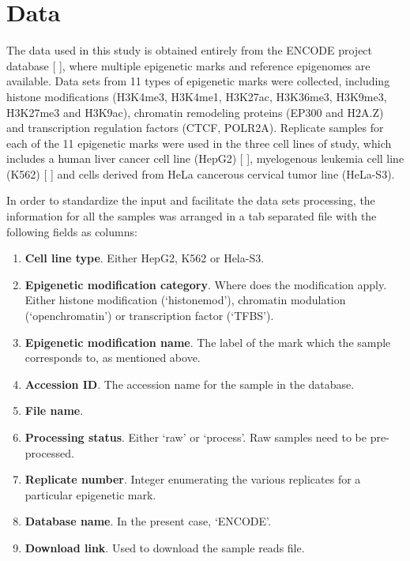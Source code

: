 \section{Data}

The data used in this study is obtained entirely from the ENCODE project database [ ], where multiple epigenetic marks and reference epigenomes are available. Data sets from 11 types of epigenetic marks were collected, including histone modifications (H3K4me3, H3K4me1, H3K27ac, H3K36me3, H3K9me3, H3K27me3 and H3K9ac), chromatin remodeling proteins (EP300 and H2A.Z) and transcription regulation factors (CTCF, POLR2A). Replicate samples for each of the 11 epigenetic marks were used in the three cell lines of study, which includes a human liver cancer cell line (HepG2) [ ], myelogenous leukemia cell line (K562) [ ] and cells derived from HeLa cancerous cervical tumor line (HeLa-S3).

\medskip

In order to standardize the input and facilitate the data sets processing, the information for all the samples was arranged in a tab separated file with the following fields as columns:

\begin{enumerate}
    \item \textbf{Cell line type}. Either HepG2, K562 or Hela-S3.
    \item \textbf{Epigenetic modification category}. Where does the modification apply. Either histone modification (`histonemod'), chromatin modulation (`openchromatin') or transcription factor (`TFBS').
    \item \textbf{Epigenetic modification name}. The label of the mark which the sample corresponds to, as mentioned above.
    \item \textbf{Accession ID}. The accession name for the sample in the database.
    \item \textbf{File name}.
    \item \textbf{Processing status}. Either `raw' or `process'. Raw samples need to be pre-processed.
    \item \textbf{Replicate number}. Integer enumerating the various replicates for a particular epigenetic mark.
    \item \textbf{Database name}. In the present case, `ENCODE'.
    \item \textbf{Download link}. Used to download the sample reads file.
\end{enumerate}

